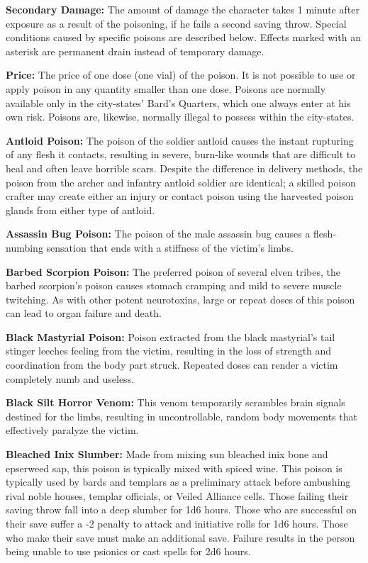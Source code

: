 \textbf{Secondary Damage:} The amount of damage the character takes 1 minute after exposure as a result of the poisoning, if he fails a second saving throw. Special conditions caused by specific poisons are described below. Effects marked with an asterisk are permanent drain instead of temporary damage.

\textbf{Price:} The price of one dose (one vial) of the poison. It is not possible to use or apply poison in any quantity smaller than one dose. Poisons are normally available only in the city-states' Bard's Quarters, which one always enter at his own risk. Poisons are, likewise, normally illegal to possess within the city-states.


\textbf{Antloid Poison:} The poison of the soldier antloid causes the instant rupturing of any flesh it contacts, resulting in severe, burn-like wounds that are difficult to heal and often leave horrible scars. Despite the difference in delivery methods, the poison from the archer and infantry antloid soldier are identical; a skilled poison crafter may create either an injury or contact poison using the harvested poison glands from either type of antloid.

\textbf{Assassin Bug Poison:} The poison of the male assassin bug causes a flesh-numbing sensation that ends with a stiffness of the victim's limbs.

\textbf{Barbed Scorpion Poison:} The preferred poison of several elven tribes, the barbed scorpion's poison causes stomach cramping and mild to severe muscle twitching. As with other potent neurotoxins, large or repeat doses of this poison can lead to organ failure and death.

\textbf{Black Mastyrial Poison:} Poison extracted from the black mastyrial's tail stinger leeches feeling from the victim, resulting in the loss of strength and coordination from the body part struck. Repeated doses can render a victim completely numb and useless.

\textbf{Black Silt Horror Venom:} This venom temporarily scrambles brain signals destined for the limbs, resulting in uncontrollable, random body movements that effectively paralyze the victim.

\textbf{Bleached Inix Slumber:} Made from mixing sun bleached inix bone and epserweed sap, this poison is typically mixed with spiced wine. This poison is typically used by bards and templars as a preliminary attack before ambushing rival noble houses, templar officials, or Veiled Alliance cells. Those failing their saving throw fall into a deep slumber for 1d6 hours. Those who are successful on their save suffer a -2 penalty to attack and initiative rolls for 1d6 hours. Those who make their save must make an additional save. Failure results in the person being unable to use psionics or cast spells for 2d6 hours.

